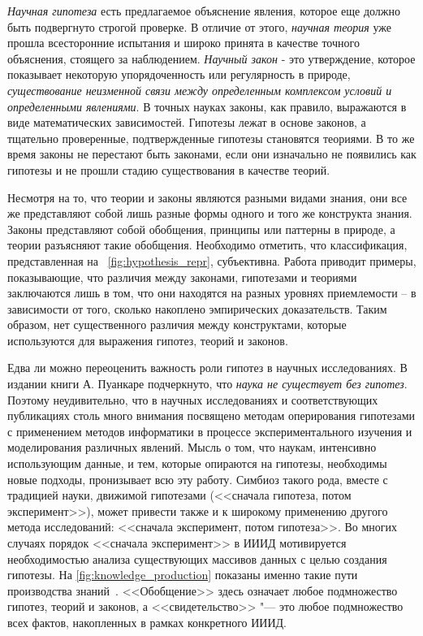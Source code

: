 \textit{Научная гипотеза} есть предлагаемое объяснение явления, которое еще должно быть подвергнуто строгой проверке. 
В отличие от этого, \textit{научная теория} уже прошла всесторонние испытания и широко принята в качестве точного 
объяснения, стоящего за наблюдением. \textit{Научный закон} - это утверждение, которое показывает некоторую 
упорядоченность или регулярность в природе, \textit{существование неизменной связи между определенным комплексом 
условий и определенными явлениями}. В точных науках законы, как правило, выражаются в виде математических зависимостей. 
Гипотезы лежат в основе законов, а тщательно проверенные, подтвержденные гипотезы становятся теориями. В то же время 
законы не перестают быть законами, если они изначально не появились как гипотезы и не прошли стадию существования 
в качестве теорий.

Несмотря на то, что теории и законы являются разными видами знания, они все же представляют собой лишь разные формы 
одного и того же конструкта знания. Законы представляют собой обобщения, принципы или паттерны в природе, а теории 
разъясняют такие обобщения. Необходимо отметить, что классификация, представленная на ~\cref{fig:hypothesis_repr}, 
субъективна. Работа \cite{Rao1998} приводит примеры, показывающие, что различия между законами, гипотезами и теориями 
заключаются лишь в том, что они находятся на разных уровнях приемлемости – в зависимости от того, сколько накоплено 
эмпирических доказательств. Таким образом, нет существенного различия между конструктами, которые используются для 
выражения гипотез, теорий и законов. 

Едва ли можно переоценить важность роли гипотез в научных исследованиях. В издании книги А. Пуанкаре\cite{Poincare2015} 
подчеркнуто, что \textit{наука не существует без гипотез}. Поэтому неудивительно, что в научных исследованиях и 
соответствующих публикациях столь много внимания посвящено методам оперирования гипотезами с применением методов 
информатики в процессе экспериментального изучения и моделирования различных явлений. Мысль о том, что наукам, 
интенсивно использующим данные, и тем, которые опираются на гипотезы, необходимы новые подходы, пронизывает всю эту 
работу. Симбиоз такого рода, вместе с традицией науки, движимой гипотезами (<<сначала гипотеза, потом эксперимент>>), 
может привести также и к широкому применению другого метода исследований: <<сначала эксперимент, потом гипотеза>>. 
Во многих случаях порядок <<сначала эксперимент>> в ИИИД мотивируется необходимостью анализа существующих массивов 
данных с целью создания гипотезы. На \cref{fig:knowledge_production} показаны именно такие пути производства 
знаний~\cite{McComas2005}. <<Обобщение>> здесь означает любое подмножество гипотез, теорий и законов, 
а <<свидетельство>> "--- это любое подмножество всех фактов, накопленных в рамках конкретного ИИИД.

